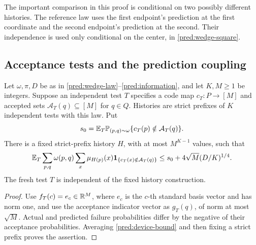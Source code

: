The important comparison in this proof is conditional on two possibly
different histories.  The reference law uses the first endpoint's prediction
at the first coordinate and the second endpoint's prediction at the second.
Their independence is used only conditional on the
center, in \eqref{pred:wedge-square}.

\subsection{Acceptance tests and the prediction coupling}

\begin{corollary}\label{pred:acceptance}
Let \(\omega,\pi,D\) be as in
\eqref{pred:wedge-law}--\eqref{pred:information}, and let \(K,M\ge1\)
be integers. Suppose an independent test \(T\) specifies a code map
\(c_T:P\to[M]\) and accepted sets \(\mathcal A_T(q)\subseteq[M]\)
for \(q\in Q\). Histories are strict prefixes of \(K\) independent
tests with this law.
Put
\[
 s_0=\mathbb E_T\mathbb P_{(p,q)\sim\omega}
                \{c_T(p)\notin\mathcal A_T(q)\}.
\]
There is a fixed strict-prefix history \(H\), with at most \(M^{K-1}\)
values, such that
\begin{equation}\label{pred:acceptance-bound}
 \mathbb E_T\sum_{p,q}\omega(p,q)
       \sum_x\mu_{H(p)}(x)
             \mathbf1_{\{c_T(x)\notin\mathcal A_T(q)\}}
 \le s_0+4\sqrt M(D/K)^{1/4}.
\end{equation}
The fresh test \(T\) is independent of the fixed history construction.
\end{corollary}

\begin{proof}
Use \(f_T(c)=e_c\in\mathbb R^M\), where \(e_c\) is the \(c\)-th standard
basis vector and has norm one, and use the acceptance indicator
vector as \(g_T(q)\), of norm at most \(\sqrt M\).  Actual and predicted
failure probabilities differ by the negative of their acceptance
probabilities.  Averaging \eqref{pred:device-bound} and then fixing a strict
prefix proves the assertion.
\end{proof}

